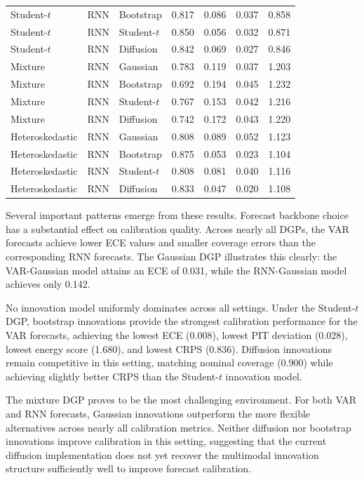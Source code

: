 \documentclass[11pt]{article}
\begin{document}
\begin{table}[H]
\begin{tabular}{lllrrrr}
Student-$t$ & RNN & Bootstrap & 0.817 & 0.086 & 0.037 & 0.858 \\
Student-$t$ & RNN & Student-$t$ & 0.850 & 0.056 & 0.032 & 0.871 \\
Student-$t$ & RNN & Diffusion & 0.842 & 0.069 & 0.027 & 0.846 \\
\midrule
Mixture & RNN & Gaussian & 0.783 & 0.119 & 0.037 & 1.203 \\
Mixture & RNN & Bootstrap & 0.692 & 0.194 & 0.045 & 1.232 \\
Mixture & RNN & Student-$t$ & 0.767 & 0.153 & 0.042 & 1.216 \\
Mixture & RNN & Diffusion & 0.742 & 0.172 & 0.043 & 1.220 \\
\midrule
Heteroskedastic & RNN & Gaussian & 0.808 & 0.089 & 0.052 & 1.123 \\
Heteroskedastic & RNN & Bootstrap & 0.875 & 0.053 & 0.023 & 1.104 \\
Heteroskedastic & RNN & Student-$t$ & 0.808 & 0.081 & 0.040 & 1.116 \\
Heteroskedastic & RNN & Diffusion & 0.833 & 0.047 & 0.020 & 1.108 \\
\bottomrule
\end{tabular}
\end{table}

Several important patterns emerge from these results. Forecast backbone choice has a substantial effect on calibration quality. Across nearly all DGPs, the VAR forecasts achieve lower ECE values and smaller coverage errors than the corresponding RNN forecasts. The Gaussian DGP illustrates this clearly: the VAR-Gaussian model attains an ECE of 0.031, while the RNN-Gaussian model achieves only 0.142.

No innovation model uniformly dominates across all settings. Under the Student-$t$ DGP, bootstrap innovations provide the strongest calibration performance for the VAR forecasts, achieving the lowest ECE (0.008), lowest PIT deviation (0.028), lowest energy score (1.680), and lowest CRPS (0.836). Diffusion innovations remain competitive in this setting, matching nominal coverage (0.900) while achieving slightly better CRPS than the Student-$t$ innovation model.

The mixture DGP proves to be the most challenging environment. For both VAR and RNN forecasts, Gaussian innovations outperform the more flexible alternatives across nearly all calibration metrics. Neither diffusion nor bootstrap innovations improve calibration in this setting, suggesting that the current diffusion implementation does not yet recover the multimodal innovation structure sufficiently well to improve forecast calibration.
\end{document}
